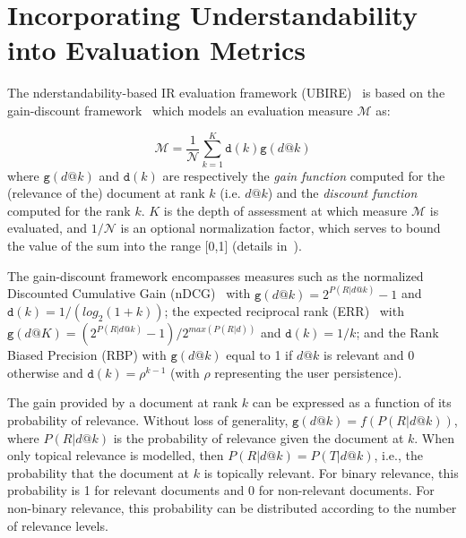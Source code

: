 \section{Incorporating Understandability into Evaluation Metrics}
\label{sec:understandability_metrics}
The nderstandability-based IR evaluation framework (UBIRE)~\cite{zuccon14,zuccon16} is based on the gain-discount framework~\cite{carterette11} which models an evaluation measure $\mathcal{M}$ as:




%
\begin{equation*}
\mathcal{M} = \frac{1}{\mathcal{N}} \sum_{k=1}^{K} \mathtt{d}(k) \mathtt{g}(d@k)
\end{equation*}
%
where $\mathtt{g}(d@k)$ and $\mathtt{d}(k)$ are respectively the \textit{gain function} computed for the (relevance of the) document at rank $k$ (i.e. $d@k$) and the \textit{discount function} computed for the rank $k$.
$K$ is the depth of assessment at which measure $\mathcal{M}$ is evaluated, and $1/\mathcal{N}$ is an optional normalization factor, which serves to bound the value of the sum into the range [0,1] (details in~\cite{carterette11}).

The gain-discount framework encompasses measures such as the normalized Discounted Cumulative Gain (nDCG)~\cite{jarvelin02} with $\mathtt{g}(d@k) = 2^{P(R|d@k)} - 1$ and $\mathtt{d}(k) = 1/(log_2(1 + k))$; the expected reciprocal rank (ERR)~\cite{chapelle09} with $\mathtt{g}(d@K) =  (2^{P (R|d@k)} - 1)/2^{max(P (R|d))}$ and $\mathtt{d}(k) = 1/k$; and the Rank Biased Precision (RBP) with $\mathtt{g}(d@k)$ equal to 1 if $d@k$ is relevant and 0 otherwise and $\mathtt{d}(k) = \rho^{k-1}$ (with $\rho$ representing the user persistence).

The gain provided by a document at rank $k$ can be expressed as a function of its probability of relevance. Without loss of generality, $\mathtt{g}(d@k) = f(P(R|d@k))$, where $P(R|d@k)$ is the probability of relevance given the document at $k$. 
When only topical relevance is modelled, then $P(R|d@k) = P(T|d@k)$, i.e., the probability that the document at $k$ is topically relevant. 
For binary relevance, this probability is 1 for relevant documents and 0 for non-relevant documents. For non-binary relevance, this probability can be distributed according to the number of relevance levels.

